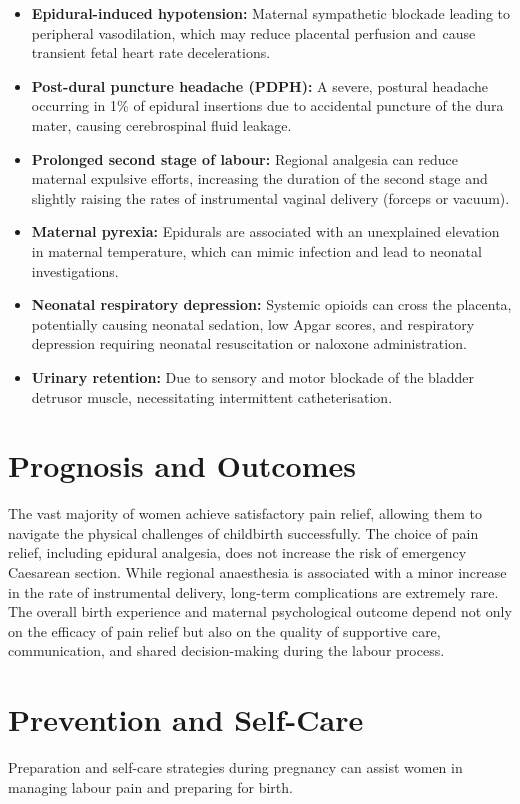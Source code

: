 \begin{itemize}
    \item \textbf{Epidural-induced hypotension:} Maternal sympathetic blockade leading to peripheral vasodilation, which may reduce placental perfusion and cause transient fetal heart rate decelerations.
    \item \textbf{Post-dural puncture headache (PDPH):} A severe, postural headache occurring in 1\% of epidural insertions due to accidental puncture of the dura mater, causing cerebrospinal fluid leakage.
    \item \textbf{Prolonged second stage of labour:} Regional analgesia can reduce maternal expulsive efforts, increasing the duration of the second stage and slightly raising the rates of instrumental vaginal delivery (forceps or vacuum).
    \item \textbf{Maternal pyrexia:} Epidurals are associated with an unexplained elevation in maternal temperature, which can mimic infection and lead to neonatal investigations.
    \item \textbf{Neonatal respiratory depression:} Systemic opioids can cross the placenta, potentially causing neonatal sedation, low Apgar scores, and respiratory depression requiring neonatal resuscitation or naloxone administration.
    \item \textbf{Urinary retention:} Due to sensory and motor blockade of the bladder detrusor muscle, necessitating intermittent catheterisation.
\end{itemize}

\section*{Prognosis and Outcomes}
The vast majority of women achieve satisfactory pain relief, allowing them to navigate the physical challenges of childbirth successfully. The choice of pain relief, including epidural analgesia, does not increase the risk of emergency Caesarean section. While regional anaesthesia is associated with a minor increase in the rate of instrumental delivery, long-term complications are extremely rare. The overall birth experience and maternal psychological outcome depend not only on the efficacy of pain relief but also on the quality of supportive care, communication, and shared decision-making during the labour process.

\section*{Prevention and Self-Care}
Preparation and self-care strategies during pregnancy can assist women in managing labour pain and preparing for birth.

